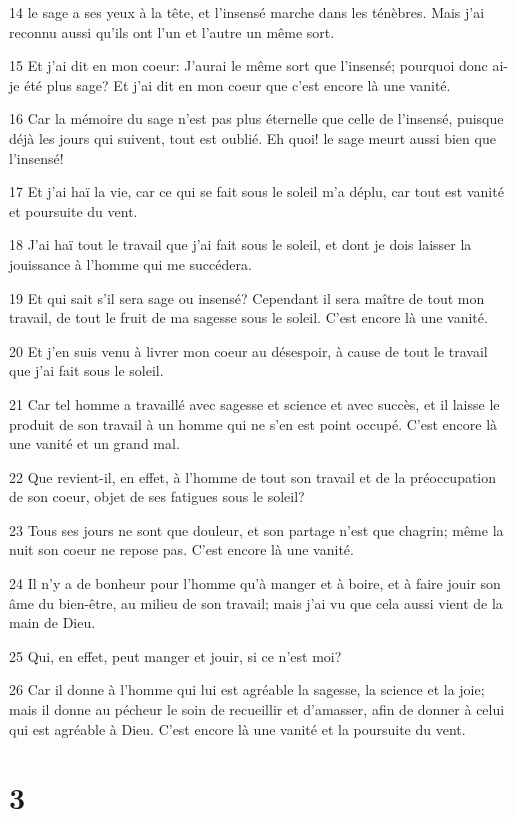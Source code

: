 \par 14 le sage a ses yeux à la tête, et l'insensé marche dans les ténèbres. Mais j'ai reconnu aussi qu'ils ont l'un et l'autre un même sort.
\par 15 Et j'ai dit en mon coeur: J'aurai le même sort que l'insensé; pourquoi donc ai-je été plus sage? Et j'ai dit en mon coeur que c'est encore là une vanité.
\par 16 Car la mémoire du sage n'est pas plus éternelle que celle de l'insensé, puisque déjà les jours qui suivent, tout est oublié. Eh quoi! le sage meurt aussi bien que l'insensé!
\par 17 Et j'ai haï la vie, car ce qui se fait sous le soleil m'a déplu, car tout est vanité et poursuite du vent.
\par 18 J'ai haï tout le travail que j'ai fait sous le soleil, et dont je dois laisser la jouissance à l'homme qui me succédera.
\par 19 Et qui sait s'il sera sage ou insensé? Cependant il sera maître de tout mon travail, de tout le fruit de ma sagesse sous le soleil. C'est encore là une vanité.
\par 20 Et j'en suis venu à livrer mon coeur au désespoir, à cause de tout le travail que j'ai fait sous le soleil.
\par 21 Car tel homme a travaillé avec sagesse et science et avec succès, et il laisse le produit de son travail à un homme qui ne s'en est point occupé. C'est encore là une vanité et un grand mal.
\par 22 Que revient-il, en effet, à l'homme de tout son travail et de la préoccupation de son coeur, objet de ses fatigues sous le soleil?
\par 23 Tous ses jours ne sont que douleur, et son partage n'est que chagrin; même la nuit son coeur ne repose pas. C'est encore là une vanité.
\par 24 Il n'y a de bonheur pour l'homme qu'à manger et à boire, et à faire jouir son âme du bien-être, au milieu de son travail; mais j'ai vu que cela aussi vient de la main de Dieu.
\par 25 Qui, en effet, peut manger et jouir, si ce n'est moi?
\par 26 Car il donne à l'homme qui lui est agréable la sagesse, la science et la joie; mais il donne au pécheur le soin de recueillir et d'amasser, afin de donner à celui qui est agréable à Dieu. C'est encore là une vanité et la poursuite du vent.

\chapter{3}

